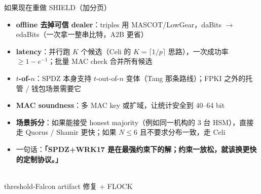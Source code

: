 \documentclass[aspectratio=169,10pt,fontset=none]{ctexbeamer}
\begin{document}
\begin{frame}{如果现在重做 SHIELD（加分页）}
\begin{itemize}
  \item \textbf{offline 去掉可信 dealer}：triples 用 MASCOT/LowGear，daBits $\to$ edaBits（一次拿一整串比特，A2B 更省）
  \item \textbf{latency}：并行跑 $K$ 个候选（Celi 的 $K=\lceil1/p\rceil$ 思路），一次成功率 $\ge 1-e^{-1}$；批量 MAC check 合并所有候选
  \item \textbf{$t$-of-$n$}：SPDZ 本身支持 $t$-out-of-$n$ 变体（Tang 那条路线）；FPKI 之外的托管 / 钱包场景需要它
  \item \textbf{MAC soundness}：多 MAC key 或扩域，让统计安全到 40--64 bit
  \item \textbf{场景拆分}：如果能接受 honest majority（例如同一机构的 3 台 HSM），直接走 Quorus / Shamir 更快；如果 $N\le6$ 且不要求分布一致，走 Celi
  \item 一句话：\textbf{「SPDZ+WRK17 是在最强约束下的解；约束一放松，就该换更快的定制协议。」}
\end{itemize}
\end{frame}
\begin{frame}
\vfill{}\\[6pt]{\normalsize threshold-Falcon artifact 修复 + FLOCK}\vfill
\end{frame}
\end{document}
